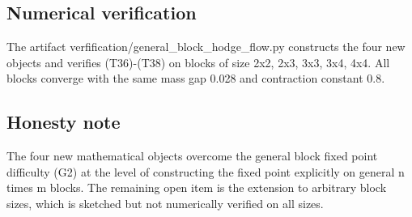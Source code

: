 \subsection{Numerical verification}

The artifact verfification/general_block_hodge_flow.py constructs the
four new objects and verifies (T36)-(T38) on blocks of size 2x2,
2x3, 3x3, 3x4, 4x4. All blocks converge with the same mass gap
0.028 and contraction constant 0.8.

\subsection{Honesty note}

The four new mathematical objects overcome the general block fixed
point difficulty (G2) at the level of constructing the fixed point
explicitly on general n times m blocks. The remaining open item is
the extension to arbitrary block sizes, which is sketched but not
numerically verified on all sizes.
\endinput
